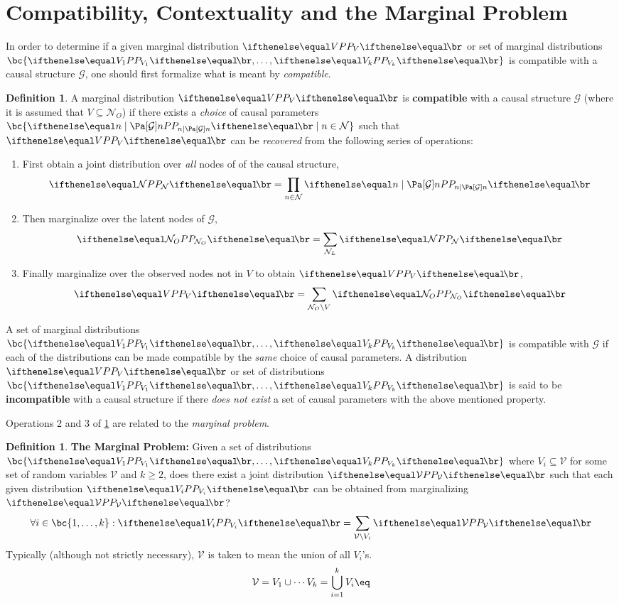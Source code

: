 \documentclass[aps, 10pt, english, twoside, pra, nofootinbib, longbibliography]{revtex4-1}
\theoremstyle{plain}
\theoremstyle{definition}
\newtheorem{definition}[theorem]{Definition}
\theoremstyle{remark}
\newcommand{\graph}{\mathcal{G}}
\newcommand{\nodes}{\mathcal{N}}
\newcommand{\term}[1]{\textcolor{Mahogany}{\textbf{#1}}}
\begin{document}
    \section{Compatibility, Contextuality and the Marginal Problem}
    In order to determine if a given marginal distribution $\prob[V]$ or set of marginal distributions $\bc{\prob[V_1], \ldots, \prob[V_k]}$ is compatible with a causal structure $\graph$, one should first formalize what is meant by \textit{compatible}.
    \begin{definition}
        \label{def:compatible}
        A marginal distribution $\prob[V]$ is \term{compatible} with a causal structure $\graph$ (where it is assumed that $V \subseteq \nodes_O$) if there exists a \textit{choice} of causal parameters $\bc{\prob[n \mid \Pa[\graph]{n}] \mid n \in \nodes}$ such that $\prob[V]$ can be \textit{recovered} from the following series of operations:

        \begin{enumerate}
            \item First obtain a joint distribution over \textit{all} nodes of of the causal structure,
            \[ \prob[\nodes] = \prod_{n \in \nodes} \prob[n \mid \Pa[\graph]{n}] \]
            \item Then marginalize over the latent nodes of $\graph$,
            \[ \prob[\nodes_O] = \sum_{\nodes_L} \prob[\nodes] \]
            \item Finally marginalize over the observed nodes not in $V$ to obtain $\prob[V]$,
            \[ \prob[V] = \sum_{\nodes_O \setminus V} \prob[\nodes_O] \]
        \end{enumerate}
        A set of marginal distributions $\bc{\prob[V_1], \ldots, \prob[V_k]}$ is compatible with $\graph$ if each of the distributions can be made compatible by the \textit{same} choice of causal parameters.
        A distribution $\prob[V]$ or set of distributions $\bc{\prob[V_1], \ldots, \prob[V_k]}$ is said to be \term{incompatible} with a causal structure if there \textit{does not exist} a set of causal parameters with the above mentioned property.

    \end{definition}

    Operations 2 and 3 of \cref{def:compatible} are related to the \textit{marginal problem}.
    \begin{definition}
        \label{def:marginal_problem}
        \term{The Marginal Problem:} Given a set of distributions $\bc{\prob[V_1], \ldots, \prob[V_k]}$ where $V_i \subseteq \mathcal{V}$ for some set of random variables $\mathcal{V}$ and $k \geq 2$, does there exist a joint distribution $\prob[\mathcal{V}]$ such that each given distribution $\prob[V_i]$ can be obtained from marginalizing $\prob[\mathcal{V}]$?
        \[ \forall i \in \bc{1, \ldots, k} : \prob[V_i] = \sum_{\mathcal{V} \setminus V_i} \prob[\mathcal{V}] \]
        Typically (although not strictly necessary), $\mathcal{V}$ is taken to mean the union of all $V_i$'s.
        \[ \mathcal{V} = V_1 \cup \cdots V_k = \bigcup_{i=1}^{k} V_i \eq \label{eq:marginals_union} \]
    \end{definition}
\end{document}
